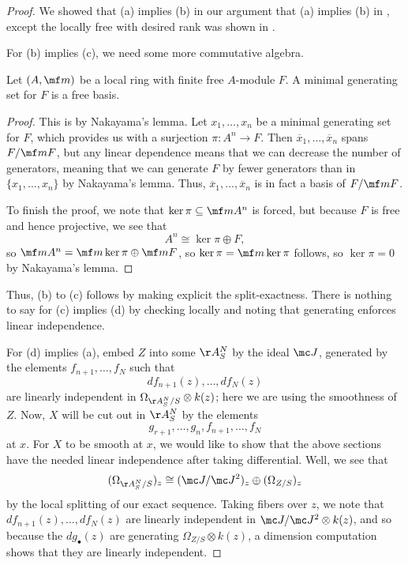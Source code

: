 \documentclass[../notes.tex]{subfiles}
\begin{document}
\begin{proof}
	We showed that (a) implies (b) in our argument that (a) implies (b) in , except the locally free with desired rank was shown in .

	For (b) implies (c), we need some more commutative algebra.
	\begin{lemma}
		Let $(A,\mf m)$ be a local ring with finite free $A$-module $F$. A minimal generating set for $F$ is a free basis.
	\end{lemma}
	\begin{proof}
		This is by Nakayama's lemma. Let $x_1,\ldots,x_n$ be a minimal generating set for $F$, which provides us with a surjection $\pi\colon A^n\to F$. Then $\overline x_1,\ldots,\overline x_n$ spans $F/\mf mF$, but any linear dependence means that we can decrease the number of generators, meaning that we can generate $F$ by fewer generators than in $\{x_1,\ldots,x_n\}$ by Nakayama's lemma. Thus, $\overline x_1,\ldots,\overline x_n$ is in fact a basis of $F/\mf mF$.

		To finish the proof, we note that $\ker\pi\subseteq\mf mA^n$ is forced, but because $F$ is free and hence projective, we see that
		\[A^n\cong\ker\pi\oplus F,\]
		so $\mf mA^n=\mf m\ker\pi\oplus\mf mF$, so $\ker\pi=\mf m\ker\pi$ follows, so $\ker\pi=0$ by Nakayama's lemma.
	\end{proof}
	Thus, (b) to (c) follows by making explicit the split-exactness. There is nothing to say for (c) implies (d) by checking locally and noting that generating enforces linear independence.

	For (d) implies (a), embed $Z$ into some $\AA^N_S$ by the ideal $\mc J$, generated by the elements $f_{n+1},\ldots,f_N$ such that
	\[df_{n+1}(z),\ldots,df_N(z)\]
	are linearly independent in $\Omega_{\AA^N_S/S}\otimes k(z)$; here we are using the smoothness of $Z$. Now, $X$ will be cut out in $\AA^N_S$ by the elements
	\[g_{r+1},\ldots,g_n,f_{n+1},\ldots,f_N\]
	at $x$. For $X$ to be smooth at $x$, we would like to show that the above sections have the needed linear independence after taking differential. Well, we see that
	\[(\Omega_{\AA^N_S/S})_z\cong(\mc J/\mc J^2)_z\oplus(\Omega_{Z/S})_z\]
	by the local splitting of our exact sequence. Taking fibers over $z$, we note that $df_{n+1}(z),\ldots,df_N(z)$ are linearly independent in $\mc J/\mc J^2\otimes k(z)$, and so because the $dg_\bullet(z)$ are generating $\Omega_{Z/S}\otimes k(z)$, a dimension computation shows that they are linearly independent.
\end{proof}
\end{document}
